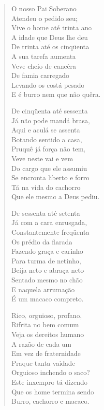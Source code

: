 \begin{verse}
O nosso Pai Soberano\\
Atendeu o pedido seu;\\
Vive o home até trinta ano\\
A idade que Deus lhe deu\\
De trinta até os cinqüenta\\
A sua tarefa aumenta\\
Veve cheio de cancêra\\
De famia carregado\\
Levando os costá pesado\\
E é burro nem que não quêra.

De cinqüenta até sessenta\\
Já não pode mandá brasa,\\
Aqui e aculá se assenta\\
Botando sentido a casa,\\
Pruquê já força não tem,\\
Veve neste vai e vem\\
Do cargo que ele assumiu\\
Se encronta liberto e forro\\
Tá na vida do cachorro\\
Que ele mesmo a Deus pediu.

De sessenta até setenta\\
Já com a cara enrusgada,\\
Constantemente freqüenta\\
Os prédio da fiarada\\
Fazendo graça e carinho\\
Para turma de netinho,\\
Beija neto e abraça neto\\
Sentado mesmo no chão\\
E naquela arrumação\\
É um macaco compreto.

Rico, orguioso, profano,\\
Rifrita no bem comum\\
Veja os dereitos humano\\
A razão de cada um\\
Em vez de fraternidade\\
Praque tanta vaidade\\
Orguioso inchendo o saco?\\
Este inxempro tá dizendo\\
Que os home termina sendo\\
Burro, cachorro e macaco.
\end{verse}

